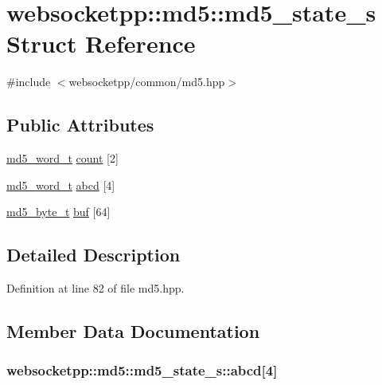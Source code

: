 \hypertarget{structwebsocketpp_1_1md5_1_1md5__state__s}{}\section{websocketpp\+:\+:md5\+:\+:md5\+\_\+state\+\_\+s Struct Reference}
\label{structwebsocketpp_1_1md5_1_1md5__state__s}


{\ttfamily \#include $<$websocketpp/common/md5.\+hpp$>$}

\subsection*{Public Attributes}
\begin{DoxyCompactItemize}
\item 
\hyperlink{namespacewebsocketpp_1_1md5_a0ece422ac11bb1332dcf342ced42ac96}{md5\+\_\+word\+\_\+t} \hyperlink{structwebsocketpp_1_1md5_1_1md5__state__s_a749f80b1f08f2e740e63a05a8821cf5c}{count} \mbox{[}2\mbox{]}
\item 
\hyperlink{namespacewebsocketpp_1_1md5_a0ece422ac11bb1332dcf342ced42ac96}{md5\+\_\+word\+\_\+t} \hyperlink{structwebsocketpp_1_1md5_1_1md5__state__s_a4579438de233e09db1f5994a341a3371}{abcd} \mbox{[}4\mbox{]}
\item 
\hyperlink{namespacewebsocketpp_1_1md5_a0c434041715d244182207c3413e36e71}{md5\+\_\+byte\+\_\+t} \hyperlink{structwebsocketpp_1_1md5_1_1md5__state__s_a4d3bae1432efcd8e294b910ee01ef39a}{buf} \mbox{[}64\mbox{]}
\end{DoxyCompactItemize}


\subsection{Detailed Description}


Definition at line 82 of file md5.\+hpp.



\subsection{Member Data Documentation}
\hypertarget{structwebsocketpp_1_1md5_1_1md5__state__s_a4579438de233e09db1f5994a341a3371}{}
\subsubsection[{abcd}]{ websocketpp\+::md5\+::md5\+\_\+state\+\_\+s\+::abcd\mbox{[}4\mbox{]}}\label{structwebsocketpp_1_1md5_1_1md5__state__s_a4579438de233e09db1f5994a341a3371}


